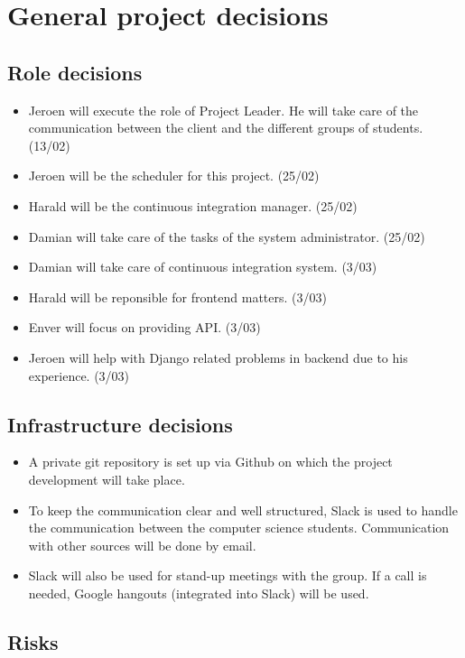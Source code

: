 \chapter{General project decisions}

\section{Role decisions}

\begin{itemize}
 \item Jeroen will execute the role of Project Leader. He will take care of the communication between the client and the different groups of students. (13/02)
 \item Jeroen will be the scheduler for this project. (25/02)
 \item Harald will be the continuous integration manager. (25/02)
 \item Damian will take care of the tasks of the system administrator. (25/02)
 \item Damian will take care of continuous integration system. (3/03)
 \item Harald will be reponsible for frontend matters. (3/03)
 \item Enver will focus on providing API. (3/03)
 \item Jeroen will help with Django related problems in backend due to his experience. (3/03)
\end{itemize}

\section{Infrastructure decisions}
\begin{itemize}
	\item A private git repository is set up via Github on which the project development will take place.
    \item To keep the communication clear and well structured, Slack is used to handle the communication between the computer science students. Communication with other sources will be done by email. 
    \item Slack will also be used for stand-up meetings with the group. If a call is needed, Google hangouts (integrated into Slack) will be used.
\end{itemize}

\section{Risks}

